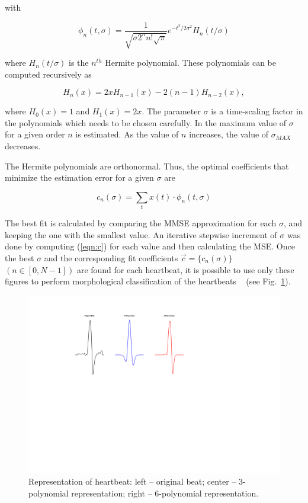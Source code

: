 \documentclass[conference]{IEEEtran}
\begin{document}
\noindent with

\begin{equation}\label{eqn:phi}
\phi_n(t,\sigma )=\frac{1}{\sqrt{\sigma 2^n n!\sqrt{\pi}}}e^{-t^2/2\sigma^2}H_n(t/\sigma) 
\end{equation}

\noindent where $H_n(t/\sigma)$ is the $n^{th}$ Hermite polynomial. 
These polynomials can be computed recursively as

\begin{equation}
H_n(x)=2xH_{n-1}(x)-2(n-1)H_{n-2}(x),
\end{equation}

\noindent where $H_0(x)=1$ and $H_1(x)=2x$.
The parameter $\sigma$ is a time-scaling factor in the polynomials which needs
to be chosen carefully.   In \cite{j:lagerholm00} the maximum value 
of $\sigma$ for a given order $n$ is estimated.  As the value of $n$ increases, the value of $\sigma_{MAX}$ decreases.

The Hermite polynomials are orthonormal.  Thus, the optimal coefficients that 
minimize the estimation error for a given $\sigma$ are

\begin{equation}\label{eqn:c}
c_n(\sigma)=\sum_{t} x(t)\cdot \phi_n(t,\sigma) 
\end{equation}

The best fit is calculated by comparing the MMSE approximation for each $\sigma$, and keeping
the one with the smallest value. An iterative stepwise increment of $\sigma$ was done by computing (\ref{eqn:c}) for each value and then calculating the MSE.
Once the best $\sigma$ and the corresponding fit coefficients $\vec{c}=\{c_n(\sigma)\}$  \mbox{$(n\in [0,N-1])$} 
are found for each heartbeat, it is possible to use only these figures to perform morphological 
classification of the heartbeats \textrm{~\cite{j:lagerholm00}} (see Fig.~\ref{fig:qrs}).

\begin{figure}[t]
	\centering
\includegraphics[width=\linewidth]{qrs_hermite.pdf} 
	\caption{Representation of heartbeat: left -- original beat; center -- 3-polynomial representation; right -- 6-polynomial representation.}
\label{fig:qrs}
	\end{figure}
	
\end{document}
